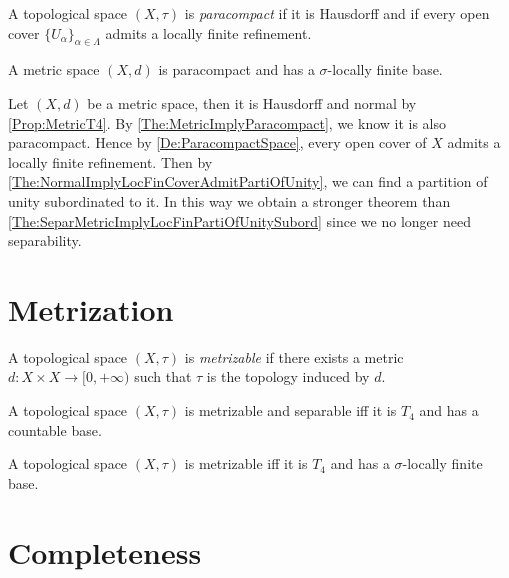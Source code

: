 \documentclass[screen,single]{techreport}
\numberwithin{equation}{section}
\begin{document}
\begin{definition}\label{De:ParacompactSpace}
  A topological space $(X,\tau)$ is \emph{paracompact} if it is Hausdorff and if every open cover $\{U_\alpha\}_{\alpha \in \Lambda}$ admits a locally finite refinement.
\end{definition}

\begin{theorem}\label{The:MetricImplyParacompact}
  A metric space $(X,d)$ is paracompact and has a $\sigma$-locally finite base.
\end{theorem}

\begin{remark}\label{Rem:StrongerThmByParacompact}
  Let $(X,d)$ be a metric space, then it is Hausdorff and normal by \cref{Prop:MetricT4}.
  By \cref{The:MetricImplyParacompact}, we know it is also paracompact.
  Hence by \cref{De:ParacompactSpace}, every open cover of $X$ admits a locally finite refinement.
  Then by \cref{The:NormalImplyLocFinCoverAdmitPartiOfUnity}, we can find a partition of unity subordinated to it.
  In this way we obtain a stronger theorem than \cref{The:SeparMetricImplyLocFinPartiOfUnitySubord} since we no longer need separability.
\end{remark}

\section{Metrization}

\begin{definition}\label{De:Metrizable}
  A topological space $(X,\tau)$ is \emph{metrizable} if there exists a metric $d : X \times X \to [0,+\infty)$ such that $\tau$ is the topology induced by $d$.
\end{definition}

\begin{theorem}\label{The:UrysohnMetrization}
  A topological space $(X,\tau)$ is metrizable and separable iff it is $T_4$ and has a countable base.
\end{theorem}

\begin{theorem}\label{The:NagataSmirnov}
  A topological space $(X,\tau)$ is metrizable iff it is $T_4$ and has a $\sigma$-locally finite base.
\end{theorem}

\section{Completeness}
\end{document}
